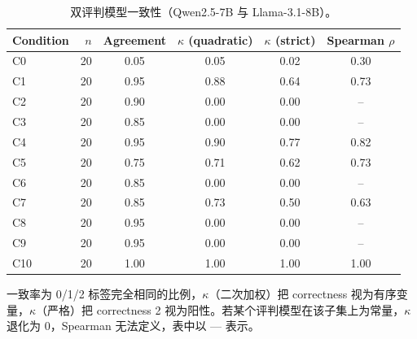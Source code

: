 \begin{table}[H]
\centering
\caption{双评判模型一致性（Qwen2.5-7B 与 Llama-3.1-8B）。}
\label{tab:judge}
\small
\begin{threeparttable}
\begin{tabular}{@{}l r c c c c@{}}
\toprule
Condition & $n$ & Agreement & $\kappa$ (quadratic) & $\kappa$ (strict) & Spearman $\rho$ \\
\midrule
C0 & 20 & 0.05 & 0.05 & 0.02 & 0.30 \\
C1 & 20 & 0.95 & 0.88 & 0.64 & 0.73 \\
C2 & 20 & 0.90 & 0.00 & 0.00 & -- \\
C3 & 20 & 0.85 & 0.00 & 0.00 & -- \\
C4 & 20 & 0.95 & 0.90 & 0.77 & 0.82 \\
C5 & 20 & 0.75 & 0.71 & 0.62 & 0.73 \\
C6 & 20 & 0.85 & 0.00 & 0.00 & -- \\
C7 & 20 & 0.85 & 0.73 & 0.50 & 0.63 \\
C8 & 20 & 0.95 & 0.00 & 0.00 & -- \\
C9 & 20 & 0.95 & 0.00 & 0.00 & -- \\
C10 & 20 & 1.00 & 1.00 & 1.00 & 1.00 \\
\bottomrule
\end{tabular}
\begin{tablenotes}\scriptsize
\item 一致率为 0/1/2 标签完全相同的比例，$\kappa$（二次加权）把 correctness 视为有序变量，$\kappa$（严格）把 correctness 2 视为阳性。若某个评判模型在该子集上为常量，$\kappa$ 退化为 0，Spearman 无法定义，表中以 --- 表示。
\end{tablenotes}
\end{threeparttable}
\end{table}
